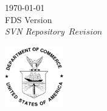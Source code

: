 \documentclass[11pt]{book}
\begin{document}

\pagestyle{empty}


\begin{minipage}[t][9in][s]{6.25in}



\normalsize

\headerC{
\authortitlesigs
}

\end{minipage}

\newpage
\hspace{5in}
\newpage

\begin{minipage}[t][9in][s]{6.25in}



\headerC{
\authorsigs
}

\begin{flushright}
\today \\
FDS Version \fdsversion \\
\emph{SVN Repository}~$Revision$
\end{flushright}


\vfill

\begin{flushright}
\includegraphics[width=1in]{../Bibliography/doc}
\end{flushright}

\titlesigs

\end{minipage}

\newpage
\end{document}
